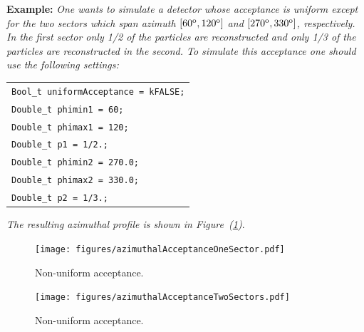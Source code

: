 \documentclass[a4paper]{book}
\numberwithin{equation}{subsection}
\begin{document}
\vspace{0.5cm}
\noindent\textbf{Example:} \textit{One wants to simulate a detector whose acceptance is uniform except for the two sectors which span azimuth $[60^{\rm o}, 120^{\rm o}]$ and $[270^{\rm o}, 330^{\rm o}]$, respectively. In the first sector only 1/2 of the particles are reconstructed and only 1/3 of the particles are reconstructed in the second. To simulate this acceptance one should use the following settings:}
%
\begin{center}
\begin{tabular}[t]{l}
\texttt{Bool\_t uniformAcceptance = kFALSE;} \\
\texttt{Double\_t phimin1 = 60;} \\
\texttt{Double\_t phimax1 = 120;} \\
\texttt{Double\_t p1 = 1/2.;} \\
\texttt{Double\_t phimin2 = 270.0;} \\
\texttt{Double\_t phimax2 = 330.0;} \\
\texttt{Double\_t p2 = 1/3.;} 
\end{tabular}
\end{center}
%
\textit{The resulting azimuthal profile is shown in Figure~(\ref{azimuthalAcceptanceTwoSectors})}.
\vspace{0.5cm}

\begin{figure}
\begin{minipage}[t]{0.5\linewidth} %
\centering
\texttt{[image: figures/azimuthalAcceptanceOneSector.pdf]}
\caption{Non-uniform acceptance.}
\label{azimuthalAcceptanceOneSector}
\end{minipage}
\hspace{0.5cm} %
\begin{minipage}[t]{0.5\linewidth}
\centering
\texttt{[image: figures/azimuthalAcceptanceTwoSectors.pdf]}
\caption{Non-uniform acceptance.}
\label{azimuthalAcceptanceTwoSectors}
\end{minipage}
\end{figure} 
\printindex
\end{document}
